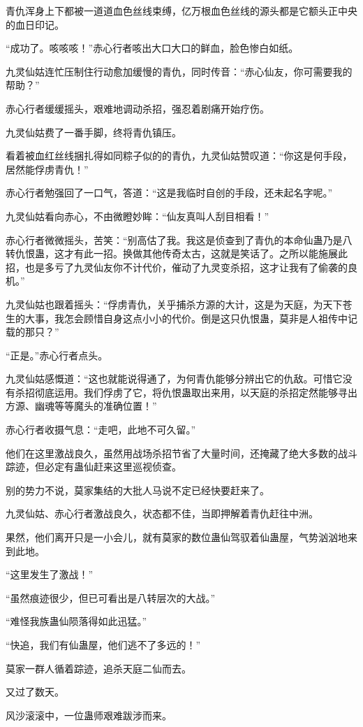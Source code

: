 \begin{this_body}
青仇浑身上下都被一道道血色丝线束缚，亿万根血色丝线的源头都是它额头正中央的血日印记。

“成功了。咳咳咳！”赤心行者咳出大口大口的鲜血，脸色惨白如纸。

九灵仙姑连忙压制住行动愈加缓慢的青仇，同时传音：“赤心仙友，你可需要我的帮助？”

赤心行者缓缓摇头，艰难地调动杀招，强忍着剧痛开始疗伤。

九灵仙姑费了一番手脚，终将青仇镇压。

看着被血红丝线捆扎得如同粽子似的的青仇，九灵仙姑赞叹道：“你这是何手段，居然能俘虏青仇！”

赤心行者勉强回了一口气，答道：“这是我临时自创的手段，还未起名字呢。”

九灵仙姑看向赤心，不由微瞪妙眸：“仙友真叫人刮目相看！”

赤心行者微微摇头，苦笑：“别高估了我。我这是侦查到了青仇的本命仙蛊乃是八转仇恨蛊，这才有此一招。换做其他传奇太古，这就是笑话了。之所以能施展此招，也是多亏了九灵仙友你不计代价，催动了九灵变杀招，这才让我有了偷袭的良机。”

九灵仙姑也跟着摇头：“俘虏青仇，关乎捕杀方源的大计，这是为天庭，为天下苍生的大事，我怎会顾惜自身这点小小的代价。倒是这只仇恨蛊，莫非是人祖传中记载的那只？”

“正是。”赤心行者点头。

九灵仙姑感慨道：“这也就能说得通了，为何青仇能够分辨出它的仇敌。可惜它没有杀招彻底运用。我们俘虏了它，将仇恨蛊取出来用，以天庭的杀招定然能够寻出方源、幽魂等等魔头的准确位置！”

赤心行者收摄气息：“走吧，此地不可久留。”

他们在这里激战良久，虽然用战场杀招节省了大量时间，还掩藏了绝大多数的战斗踪迹，但必定有蛊仙赶来这里巡视侦查。

别的势力不说，莫家集结的大批人马说不定已经快要赶来了。

九灵仙姑、赤心行者激战良久，状态都不佳，当即押解着青仇赶往中洲。

果然，他们离开只是一小会儿，就有莫家的数位蛊仙驾驭着仙蛊屋，气势汹汹地来到此地。

“这里发生了激战！”

“虽然痕迹很少，但已可看出是八转层次的大战。”

“难怪我族蛊仙陨落得如此迅猛。”

“快追，我们有仙蛊屋，他们逃不了多远的！”

莫家一群人循着踪迹，追杀天庭二仙而去。

又过了数天。

风沙滚滚中，一位蛊师艰难跋涉而来。


\end{this_body}
